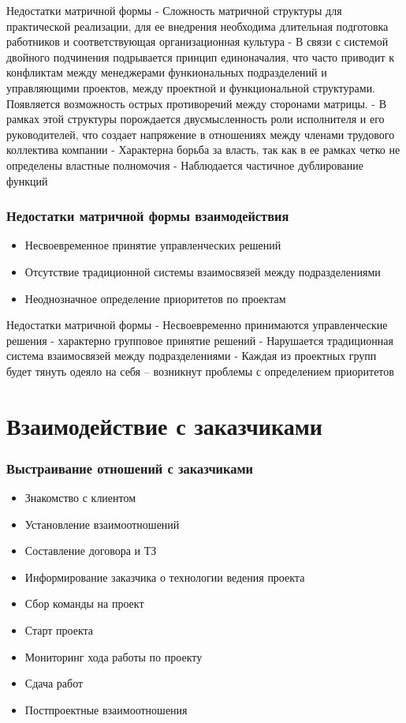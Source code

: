 \documentclass{../industrial-development}
\begin{document}
\lecturenotes
Недостатки матричной формы
- Сложность матричной структуры для практической реализации, для ее внедрения необходима длительная подготовка работников и соответствующая организационная культура
- В связи с системой двойного подчинения подрывается принцип единоначалия, что часто приводит к конфликтам между менеджерами функиональных подразделений и управляющими проектов, между проектной и функциональной структурами. Появляется возможность острых противоречий между сторонами матрицы.
- В рамках этой структуры порождается двусмысленность роли исполнителя и его руководителей, что создает напряжение в отношениях между членами трудового коллектива компании
- Характерна борьба за власть, так как в ее рамках четко не определены властные полномочия
- Наблюдается частичное дублирование функций

\begin{frame} \frametitle{Недостатки матричной формы взаимодействия}
\begin{itemize}
  \item Несвоевременное принятие управленческих решений
  \item Отсутствие традиционной системы взаимосвязей между подразделениями
  \item Неоднозначное определение приоритетов по проектам
  \end{itemize}
\end{frame}

\lecturenotes
Недостатки матричной формы
- Несвоевременно принимаются управленческие решения - характерно групповое принятие решений
- Нарушается традиционная система взаимосвязей между подразделениями
- Каждая из проектных групп будет тянуть одеяло на себя – возникнут проблемы  с определением приоритетов

\section{Взаимодействие с заказчиками}

\begin{frame} \frametitle{Выстраивание отношений с заказчиками}

\begin{itemize}
 \item Знакомство с клиентом
 \item Установление взаимоотношений
 \item Составление договора и ТЗ
 \item Информирование заказчика о технологии ведения проекта
 \item Сбор команды на проект 
 \item Старт проекта 
 \item Мониторинг хода работы по проекту
 \item Сдача работ
 \item Постпроектные взаимоотношения
  \end{itemize}
\end{frame}
\end{document}
